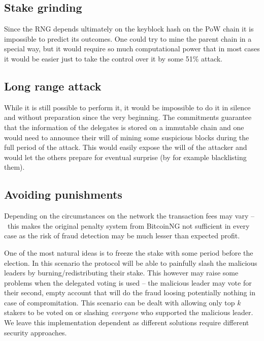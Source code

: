 \subsection{Stake grinding}

Since the RNG depends ultimately on the keyblock hash on the PoW chain it is
impossible to predict its outcomes. One could try to mine the parent chain
in a special way, but it would require so much computational power that in
most cases it would be easier just to take the control over it by some 51\%
attack.

\subsection{Long range attack}
While it is still possible to perform it, it would be impossible to do it in
silence and without preparation since the very beginning. The commitments
guarantee that the information of the delegates is stored on a immutable chain
and one would need to announce their will of mining some suspicious blocks during
the full period of the attack. This would easily expose the will of the attacker
and would let the others prepare for eventual surprise (by for example
blacklisting them).

\subsection{Avoiding punishments}
Depending on the circumstances on the network the transaction fees may vary
– this makes the original penalty system from BitcoinNG not sufficient in every
case as the risk of fraud detection may be much lesser than expected profit.

One of the most natural ideas is to freeze the stake with some period before the
election. In this scenario the protocol will be able to painfully slash the
malicious leaders by burning/redistributing their stake. This however may raise
some problems when the delegated voting is used – the malicious leader may vote
for their second, empty account that will do the fraud loosing potentially
nothing in case of compromitation. This scenario can be dealt with allowing only
top $k$ stakers to be voted on or slashing \emph{everyone} who supported the
malicious leader. We leave this implementation dependent as different solutions
require different security approaches.